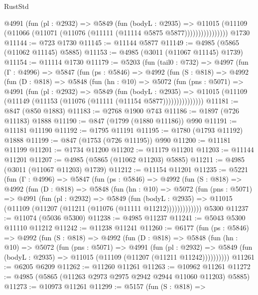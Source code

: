 \begin{lexlean}{RustStd}
\begin{coremodule}
                  @4991
                    (fun (pl : @2932) =>
                    @5849
                      (fun (bodyL : @2935) =>
                      @11015
                        (@11109 (@11066 (@11071 (@11076 (@11111 (@11114 @5875 @5877))))))))))))))))
    @1730
@11144 := @723 @1730
@11145 := @11144 @5877
@11149 := @4985 (@5865 (@11062 @11145) @5885)
@11153 := @4985 (@3011 (@11067 @11145) @1739)
@11154 := @11114 @1730
@11179 := @5203
    (fun (tail0 : @732) =>
    @4997
      (fun (Γ : @4996) =>
      @5847
        (fun (ps : @5846) =>
        @4992
          (fun (S : @818) =>
          @4992
            (fun (D : @818) =>
            @5848
              (fun (hn : @10) =>
              @5072
                (fun (pns : @5071) =>
                @4991
                  (fun (pl : @2932) =>
                  @5849
                    (fun (bodyL : @2935) =>
                    @11015 (@11109 (@11149 (@11153 (@11076 (@11111 (@11154 @5877)))))))))))))))
@11181 := @847 (@850 @1883)
@11183 := @2768 @1900 @743
@11186 := @1897 (@726 @11183) @1888
@11190 := @847 (@1799 (@1880 @11186)) @990
@11191 := @11181 @11190
@11192 := @1795 @11191
@11195 := @1780 (@1793 @11192) @1888
@11199 := @847 (@1753 (@726 @11195)) @990
@11200 := @11181 @11199
@11201 := @1734 @11200
@11202 := @11179 @11201
@11203 := @11144 @11201
@11207 := @4985 (@5865 (@11062 @11203) @5885)
@11211 := @4985 (@3011 (@11067 @11203) @1739)
@11212 := @11154 @11201
@11235 := @5221
    (fun (Γ : @4996) =>
    @5847
      (fun (ps : @5846) =>
      @4992
        (fun (S : @818) =>
        @4992
          (fun (D : @818) =>
          @5848
            (fun (hn : @10) =>
            @5072
              (fun (pns : @5071) =>
              @4991
                (fun (pl : @2932) =>
                @5849
                  (fun (bodyL : @2935) =>
                  @11015 (@11109 (@11207 (@11211 (@11076 (@11111 @11212)))))))))))))
    @5300
@11237 := @11074 (@5036 @5300)
@11238 := @4985 @11237
@11241 := @5043 @5300 @11110 @11212
@11242 := @11238 @11241
@11260 := @6177
    (fun (ps : @5846) =>
    @4992
      (fun (S : @818) =>
      @4992
        (fun (D : @818) =>
        @5848
          (fun (hn : @10) =>
          @5072
            (fun (pns : @5071) =>
            @4991
              (fun (pl : @2932) =>
              @5849 (fun (bodyL : @2935) => @11015 (@11109 (@11207 (@11211 @11242))))))))))
@11261 := @6205 @6209
@11262 := @11260 @11261
@11263 := @10962 @11261
@11272 := @4985 (@5865 (@11263 @2973 @2975 @2942 @2944 @11060 @11203) @5885)
@11273 := @10973 @11261
@11299 := @5157
    (fun (S : @818) =>

\end{coremodule}
\end{lexlean}
